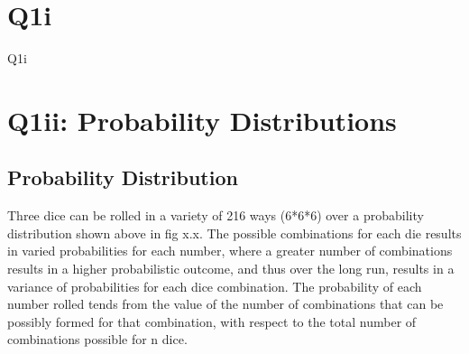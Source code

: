 \documentclass[12pt]{article}
\begin{document}
\tableofcontents
\listoffigures
{}
\listoftables
{}
\thispagestyle{empty}
\cleardoublepage
\setcounter{page}{1}

\section{Q1i}
Q1i
\clearpage

\section{Q1ii: Probability Distributions}
\subsection{Probability Distribution}
Three dice can be rolled in a variety of 216 ways (6*6*6) over a probability distribution shown above in fig x.x. The possible combinations for each die results in varied probabilities for each number, where a greater number of combinations results in a higher probabilistic outcome, and thus over the long run, results in a variance of probabilities for each dice combination. The probability of each number rolled tends from the value of the number of combinations that can be possibly formed for that combination, with respect to the total number of combinations possible for n dice.
\end{document}

